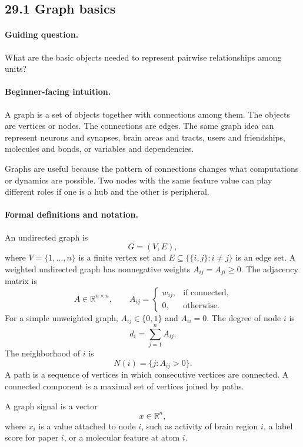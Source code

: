 \subsection{29.1 Graph basics}

\paragraph{Guiding question.}
What are the basic objects needed to represent pairwise relationships among units?

\paragraph{Beginner-facing intuition.}
A graph is a set of objects together with connections among them. The objects are vertices or nodes. The connections are edges. The same graph idea can represent neurons and synapses, brain areas and tracts, users and friendships, molecules and bonds, or variables and dependencies.

Graphs are useful because the pattern of connections changes what computations or dynamics are possible. Two nodes with the same feature value can play different roles if one is a hub and the other is peripheral.

\paragraph{Formal definitions and notation.}
An undirected graph is
\[
G=(V,E),
\]
where \(V=\{1,\ldots,n\}\) is a finite vertex set and \(E\subseteq\{\{i,j\}:i\neq j\}\) is an edge set. A weighted undirected graph has nonnegative weights \(A_{ij}=A_{ji}\geq0\). The adjacency matrix is
\[
A\in\mathbb R^{n\times n},\qquad
A_{ij}=
\begin{cases}
w_{ij}, & \text{if connected},\\
0, & \text{otherwise}.
\end{cases}
\]
For a simple unweighted graph, \(A_{ij}\in\{0,1\}\) and \(A_{ii}=0\). The degree of node \(i\) is
\[
d_i=\sum_{j=1}^n A_{ij}.
\]
The neighborhood of \(i\) is
\[
N(i)=\{j:A_{ij}>0\}.
\]
A path is a sequence of vertices in which consecutive vertices are connected. A connected component is a maximal set of vertices joined by paths.

A graph signal is a vector
\[
x\in\mathbb R^n,
\]
where \(x_i\) is a value attached to node \(i\), such as activity of brain region \(i\), a label score for paper \(i\), or a molecular feature at atom \(i\).

